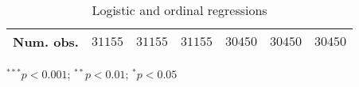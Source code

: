 \begin{table}
\begin{center}
\begin{threeparttable}
\begin{tabular}{l c c c c c c}
Num. obs.                       & $31155$       & $31155$       & $31155$       & $30450$       & $30450$       & $30450$       \\
\bottomrule
\end{tabular}
\begin{tablenotes}[flushleft]
\scriptsize{\item $^{***}p<0.001$; $^{**}p<0.01$; $^{*}p<0.05$}
\end{tablenotes}
\end{threeparttable}
\caption{Logistic and ordinal regressions}
\label{table:coefficients}
\end{center}
\end{table}
